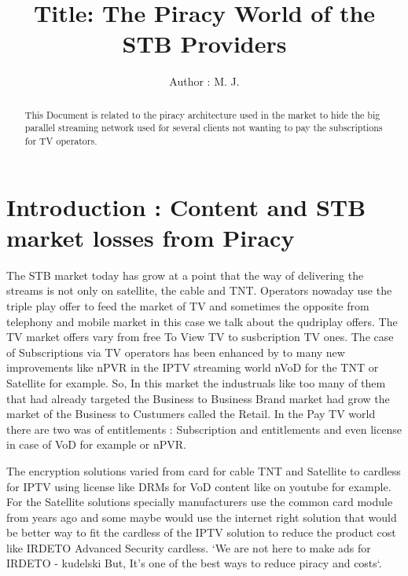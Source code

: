 \documentclass[]{IEEEibm}
\begin{document}
\title{Title: The Piracy World of the STB Providers}

\author{Author : M. J.}


\begin{abstract}
This Document is related to the piracy architecture used in the market to hide the big parallel streaming network used for several clients not wanting to pay the subscriptions for TV operators. 
\end{abstract}

\maketitle


\section{Introduction : Content and STB market losses from Piracy}

The STB market today has grow at a point that the way of delivering the streams is not only on satellite, the cable and TNT. Operators nowaday use the triple play offer to feed the market of TV and sometimes the opposite from telephony and mobile market in this case we talk about the qudriplay offers. The TV market offers vary from free To View TV to susbcription TV ones. The case of Subscriptions via TV operators has been enhanced by to many new improvements like nPVR in the IPTV streaming world nVoD for the TNT or Satellite for example. So, In this market the industruals like too many of them that had already targeted the Business to Business Brand market had grow the market of the Business to Custumers called the Retail. In the Pay TV world there are two was of entitlements : Subscription and entitlements and even license in case of VoD for example or nPVR.

The encryption solutions varied from card for cable TNT and Satellite to cardless for IPTV using license like DRMs for VoD content like on youtube for example. For the Satellite solutions specially manufacturers use the common card module from years ago and some maybe would use the internet right solution that would be better way to fit the cardless of the IPTV solution to reduce the product cost like IRDETO Advanced Security cardless. `We are not here to make ads for IRDETO - kudelski But, It's one of the best ways to reduce piracy and costs`.
\end{document}
